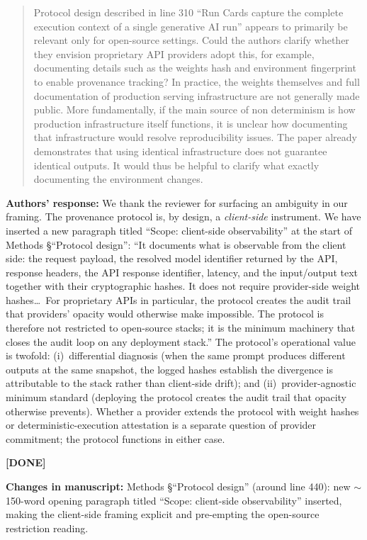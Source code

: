 \documentclass[11pt,a4paper]{article}
\newenvironment{revquote}{%
  \begin{quote}\small\itshape\color{revgray}
}{%
  \end{quote}
}
\newcommand{\response}[1]{\par\noindent\textbf{\color{revgreen}Authors' response:} #1\par}
\newcommand{\changes}[1]{\par\noindent\textbf{\color{revblue}Changes in manuscript:} #1\par}
\newcommand{\done}{\color{revgreen}\textbf{[DONE]}}
\begin{document}
\begin{revquote}
Protocol design described in line 310 ``Run Cards capture the complete execution context of a single generative AI run'' appears to primarily be relevant only for open-source settings. Could the authors clarify whether they envision proprietary API providers adopt this, for example, documenting details such as the weights hash and environment fingerprint to enable provenance tracking? In practice, the weights themselves and full documentation of production serving infrastructure are not generally made public. More fundamentally, if the main source of non determinism is how production infrastructure itself functions, it is unclear how documenting that infrastructure would resolve reproducibility issues. The paper already demonstrates that using identical infrastructure does not guarantee identical outputs. It would thus be helpful to clarify what exactly documenting the environment changes.
\end{revquote}

\response{We thank the reviewer for surfacing an ambiguity in our framing. The provenance protocol is, by design, a \emph{client-side} instrument. We have inserted a new paragraph titled ``Scope: client-side observability'' at the start of Methods §``Protocol design'': ``It documents what is observable from the client side: the request payload, the resolved model identifier returned by the API, response headers, the API response identifier, latency, and the input/output text together with their cryptographic hashes. It does not require provider-side weight hashes\ldots\ For proprietary APIs in particular, the protocol creates the audit trail that providers' opacity would otherwise make impossible. The protocol is therefore not restricted to open-source stacks; it is the minimum machinery that closes the audit loop on any deployment stack.'' The protocol's operational value is twofold: (i)~differential diagnosis (when the same prompt produces different outputs at the same snapshot, the logged hashes establish the divergence is attributable to the stack rather than client-side drift); and (ii)~provider-agnostic minimum standard (deploying the protocol creates the audit trail that opacity otherwise prevents). Whether a provider extends the protocol with weight hashes or deterministic-execution attestation is a separate question of provider commitment; the protocol functions in either case.} \done

\changes{Methods §``Protocol design'' (around line 440): new $\sim$150-word opening paragraph titled ``Scope: client-side observability'' inserted, making the client-side framing explicit and pre-empting the open-source restriction reading.}
\end{document}

